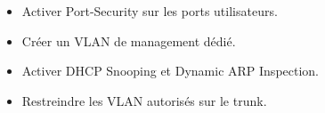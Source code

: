 \documentclass[a4paper,twoside,11pt]{article}
\begin{document}
\begin{profbox}[title=Mesures importantes]
\begin{itemize}
    \item Activer Port-Security sur les ports utilisateurs.
    \item Créer un VLAN de management dédié.
    \item Activer DHCP Snooping et Dynamic ARP Inspection.
    \item Restreindre les VLAN autorisés sur le trunk.
\end{itemize}
\end{profbox}
\end{document}
